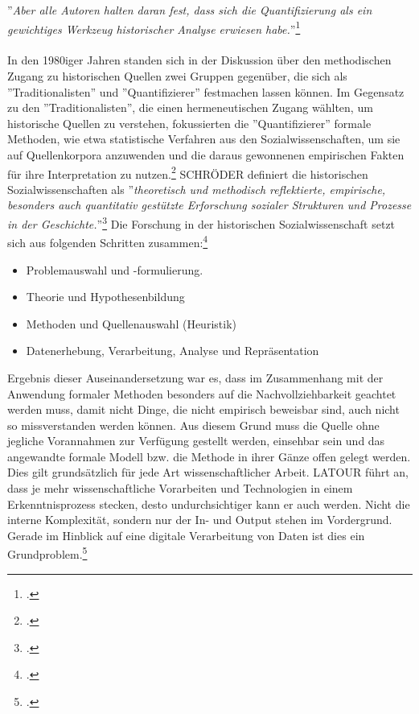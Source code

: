 \documentclass[12pt,a4paper]{article}
\begin{document}
''\textit{Aber alle Autoren halten daran fest, dass sich die Quantifizierung als ein gewichtiges Werkzeug historischer Analyse erwiesen habe.}''\footcite[][S.191-206]{jarausch1985quantitative}
\\
\\
In den 1980iger Jahren standen sich in der Diskussion über den methodischen Zugang zu historischen Quellen zwei Gruppen gegenüber, die sich als ''Traditionalisten'' und ''Quantifizierer'' festmachen lassen können. Im Gegensatz zu den ''Traditionalisten'', die einen hermeneutischen Zugang wählten, um historische Quellen zu verstehen, fokussierten die ''Quantifizierer'' formale Methoden, wie etwa statistische Verfahren aus den Sozialwissenschaften, um sie auf Quellenkorpora anzuwenden und die daraus gewonnenen empirischen Fakten für ihre Interpretation zu nutzen.\footcite[][S.191-206]{jarausch1985quantitative} 
SCHRÖDER definiert die historischen Sozialwissenschaften als
 ''\textit{theoretisch und methodisch reflektierte, empirische, besonders auch quantitativ gestützte Erforschung sozialer Strukturen und Prozesse in der Geschichte.}''\footcite[Vgl.][S.5]{schroder1988historische} Die Forschung in der historischen Sozialwissenschaft setzt sich aus folgenden Schritten zusammen:\footcite[Vgl.][S.5-8]{schroder1988historische} 
 \begin{itemize}
 \item Problemauswahl und -formulierung.
 \item Theorie und Hypothesenbildung
 \item Methoden und Quellenauswahl (Heuristik)
 \item Datenerhebung, Verarbeitung, Analyse und Repräsentation
 \end{itemize}
Ergebnis dieser Auseinandersetzung war es, dass im Zusammenhang mit der Anwendung formaler Methoden besonders auf die Nachvollziehbarkeit geachtet werden muss, damit nicht Dinge, die nicht empirisch beweisbar sind, auch nicht so missverstanden werden können. Aus diesem Grund muss die Quelle ohne jegliche Vorannahmen zur Verfügung gestellt werden, einsehbar sein und das angewandte formale Modell bzw. die Methode in ihrer Gänze offen gelegt werden. Dies gilt grundsätzlich für jede Art wissenschaftlicher Arbeit. LATOUR führt an, dass je mehr wissenschaftliche Vorarbeiten und Technologien in einem Erkenntnisprozess stecken, desto undurchsichtiger kann er auch werden. Nicht die interne Komplexität, sondern nur der In- und Output stehen im Vordergrund. Gerade im Hinblick auf eine digitale Verarbeitung von Daten ist dies ein Grundproblem.\footcite[][S.309]{latour1999pandora} 
\end{document}
